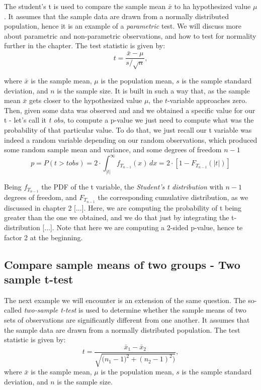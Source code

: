\documentclass{book}
\begin{document}
The student's t is used to compare the sample mean $\bar{x}$ to ha hypothesized value $\mu$. It assumes that the sample data are drawn from a normally distributed population, hence it is an example of a \textit{parametric} test. We will discuss more about parametric and non-parametric observations, and how to test for normality further in the chapter. The test statistic is given by:
\[
    t = \frac{\bar{x} - \mu}{s / \sqrt{n}},
\]


where $\bar{x}$ is the sample mean, $\mu$ is the population mean, $s$ is the sample standard deviation, and $n$ is the sample size. It is built in such a way that, as the sample mean $\bar{x}$ gets closer to the hypothesized value $\mu$, the $t$-variable approaches zero.\\



Then, given some data was observed and and we obtained a specific value for our t - let's call it \textit{t obs}, to compute a p-value we just need to compute what was the probability of that particular value. To do that, we just recall our t variable was indeed a random variable depending on our random observations, which produced some random sample mean and variance, and some degrees of freedom $n - 1$
\[
p = P\left(t > t obs \right) = 2 \cdot \int_{|t|}^{\infty} f_{T_{n-1}}(x)\,dx = 2 \cdot \left[1 - F_{T_{n-1}}(|t|)\right]
\]


Being $f_{T_{n-1}}$ the PDF of the t variable, the \textit{Student's t distribution} with $n - 1$ degrees of freedom, and $F_{T_{n-1}}$ the corresponding cumulative distribution, as we discussed in chapter 2 [...]. Here, we are computing the probability of t being greater than the one we obtained, and we do that just by integrating the t-distribution [...]. Note that here we are computing a 2-sided p-value, hence te factor 2 at the beginning. 

\newpage

\subsection{Compare sample means of two groups - Two sample t-test}

The next example we will encounter is an extension of the same question. The so-called \textit{two-sample t-test} is used to determine whether the sample means of two sets of observations are significantly different from one another. It assumes that the sample data are drawn from a normally distributed population. The test statistic is given by:
\[
    t = \frac{\bar{x}_{1} - \bar{x}_{2}}{\sqrt{\big(n_{1} - 1)^{2} + (n_{2} - 1)^{2}\big)}},
\]
where $\bar{x}$ is the sample mean, $\mu$ is the population mean, $s$ is the sample standard deviation, and $n$ is the sample size.\\
\end{document}
